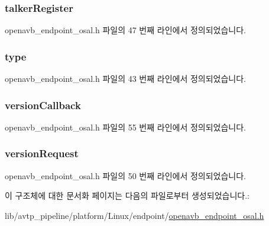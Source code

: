 \subsubsection[{\texorpdfstring{talker\+Register}{talkerRegister}}]{ talker\+Register}\hypertarget{structopenavb_endpoint_message__t_a7f36562324158a4db2e4c85fb16cd024}{}\label{structopenavb_endpoint_message__t_a7f36562324158a4db2e4c85fb16cd024}


openavb\+\_\+endpoint\+\_\+osal.\+h 파일의 47 번째 라인에서 정의되었습니다.

\subsubsection[{\texorpdfstring{type}{type}}]{ type}\hypertarget{structopenavb_endpoint_message__t_aafa5465615d5d57894a9aff52a0b8bbe}{}\label{structopenavb_endpoint_message__t_aafa5465615d5d57894a9aff52a0b8bbe}


openavb\+\_\+endpoint\+\_\+osal.\+h 파일의 43 번째 라인에서 정의되었습니다.

\subsubsection[{\texorpdfstring{version\+Callback}{versionCallback}}]{ version\+Callback}\hypertarget{structopenavb_endpoint_message__t_af1e57319836a16cab8a638539c98b8fc}{}\label{structopenavb_endpoint_message__t_af1e57319836a16cab8a638539c98b8fc}


openavb\+\_\+endpoint\+\_\+osal.\+h 파일의 55 번째 라인에서 정의되었습니다.

\subsubsection[{\texorpdfstring{version\+Request}{versionRequest}}]{ version\+Request}\hypertarget{structopenavb_endpoint_message__t_a4050d2656eb200835a4ad0ac0042b66f}{}\label{structopenavb_endpoint_message__t_a4050d2656eb200835a4ad0ac0042b66f}


openavb\+\_\+endpoint\+\_\+osal.\+h 파일의 50 번째 라인에서 정의되었습니다.



이 구조체에 대한 문서화 페이지는 다음의 파일로부터 생성되었습니다.\+:\begin{DoxyCompactItemize}
\item 
lib/avtp\+\_\+pipeline/platform/\+Linux/endpoint/\hyperlink{openavb__endpoint__osal_8h}{openavb\+\_\+endpoint\+\_\+osal.\+h}\end{DoxyCompactItemize}
